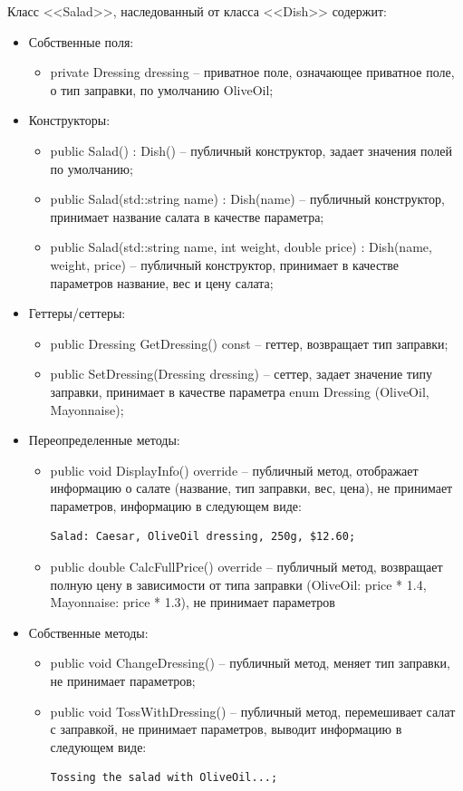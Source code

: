\documentclass[a4paper,14pt]{extarticle}
\begin{document}
Класс <<Salad>>, наследованный от класса <<Dish>> содержит:
\begin{itemize}
  \item[--] Собственные поля:
  \begin{itemize}
    \item[--] private Dressing dressing -- приватное поле, означающее приватное поле, о тип заправки, по умолчанию OliveOil;
  \end{itemize}
  \item[--] Конструкторы:
  \begin{itemize}
    \item[--] public Salad() : Dish() -- публичный конструктор, задает значения полей по умолчанию;
    \item[--] public Salad(std::string name) : Dish(name) -- публичный конструктор, принимает название салата в качестве параметра;
    \item[--] public Salad(std::string name, int weight, double price) : Dish(name, weight, price) -- публичный конструктор, принимает в качестве параметров название, вес и цену салата;
  \end{itemize}
  \item[--] Геттеры/сеттеры:
  \begin{itemize}
    \item[--] public Dressing GetDressing() const -- геттер, возвращает тип заправки;
    \item[--] public SetDressing(Dressing dressing) -- сеттер, задает значение типу заправки, принимает в качестве параметра enum Dressing (OliveOil, Mayonnaise);
  \end{itemize}
  \item[--] Переопределенные методы:
  \begin{itemize}
    \item[--] public void DisplayInfo() override -- публичный метод, отображает информацию о салате (название, тип заправки, вес, цена), не принимает параметров,  информацию в следующем виде:
    \begin{Verbatim}[tabsize=4]
Salad: Caesar, OliveOil dressing, 250g, $12.60;
    \end{Verbatim}
    \item[--] public double CalcFullPrice() override -- публичный метод, возвращает полную цену в зависимости от типа заправки (OliveOil: price * 1.4, Mayonnaise: price * 1.3), не принимает параметров
  \end{itemize}
  \item[--] Собственные методы:
  \begin{itemize}
    \item[--] public void ChangeDressing() -- публичный метод, меняет тип заправки, не принимает параметров;
    \item[--] public void TossWithDressing() -- публичный метод, перемешивает салат с заправкой, не принимает параметров, выводит информацию в следующем виде:
    \begin{Verbatim}[tabsize=4]
Tossing the salad with OliveOil...;
    \end{Verbatim}
  \end{itemize}
\end{itemize}
\end{document}
